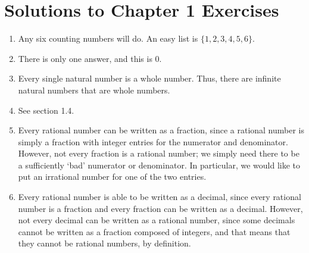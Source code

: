 \documentclass[openany]{book}
\begin{document}
\section{Solutions to Chapter 1 Exercises}
\begin{enumerate}
	\item Any six counting numbers will do. An easy list is $\{1,2,3,4,5,6\}$.
	\item There is only one answer, and this is 0.
	\item Every single natural number is a whole number. Thus, there are infinite natural numbers that are whole numbers.
	\item See section 1.4.
	\item Every rational number can be written as a fraction, since a rational number is simply a fraction with integer entries for the numerator and denominator. However, not every fraction is a rational number; we simply need there to be a sufficiently `bad' numerator or denominator. In particular, we would like to put an irrational number for one of the two entries.
	\item Every rational number is able to be written as a decimal, since every rational number is a fraction and every fraction can be written as a decimal. However, not every decimal can be written as a rational number, since some decimals cannot be written as a fraction composed of integers, and that means that they cannot be rational numbers, by definition.
\end{enumerate}
\end{document}
